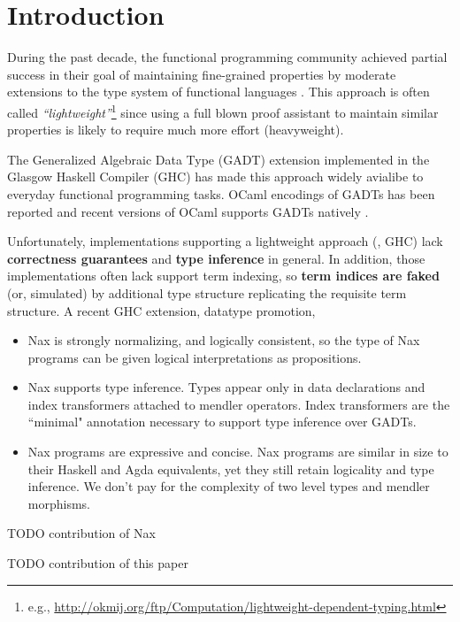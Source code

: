 \section{Introduction}
During the past decade, the functional programming community achieved
partial success in their goal of maintaining fine-grained properties
by moderate extensions to the type system of functional languages
\cite{CheHin03,CheHin02,Xi03}.
This approach is often called \emph{``lightweight''}\footnote{e.g.,
  \url{http://okmij.org/ftp/Computation/lightweight-dependent-typing.html} }
since using a full blown proof assistant to maintain similar properties
is likely to require much more effort (heavyweight).

The Generalized Algebraic Data Type (GADT) extension implemented
in the Glasgow Haskell Compiler (GHC) has made this approach
widely avialibe to everyday functional programming tasks.
OCaml encodings of GADTs has been reported \cite{ManStu09}
and recent versions of OCaml supports GADTs natively \cite{GarNor11}.

Unfortunately, implementations supporting a lightweight approach (\eg, GHC)
lack \textbf{correctness guarantees} and \textbf{type inference} in general.
In addition, those implementations often lack support term indexing,
so \textbf{term indices are faked} (or, simulated) by additional
type structure replicating the requisite term structure.
A recent GHC extension, datatype promotion,

\begin{itemize}
\item Nax is strongly normalizing, and logically consistent, so the
type of Nax programs can be given logical interpretations as propositions.

\item Nax supports type inference. Types appear only in data declarations
and index transformers attached to mendler operators. Index transformers
are the ``minimal"  annotation necessary to support type inference over GADTs.

\item Nax programs are expressive and concise. Nax programs
are similar in size to their Haskell and Agda equivalents, yet they
still retain logicality and type inference. We don't pay for the
complexity of two level types and mendler morphisms.

\end{itemize}

TODO contribution of Nax

TODO contribution of this paper


